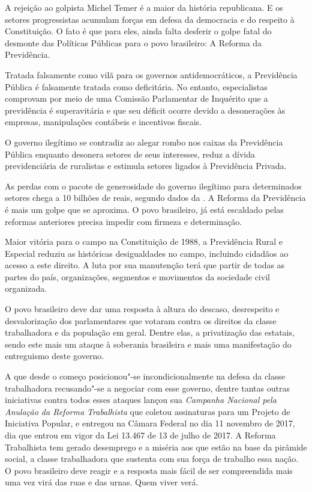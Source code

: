A rejeição ao golpista Michel Temer é a maior da história republicana. E
os setores progressistas acumulam forças em defesa da democracia e do
respeito à Constituição. O fato é que para eles, ainda falta desferir o
golpe fatal do desmonte das Políticas Públicas para o povo brasileiro: A
Reforma da Previdência.

Tratada falsamente como vilã para os governos antidemocráticos, a
Previdência Pública é falsamente tratada como deficitária. No entanto,
especialistas comprovam por meio de uma Comissão Parlamentar de
Inquérito que a previdência é superavitária e que seu déficit ocorre
devido a desonerações às empresas, manipulações contábeis e incentivos
fiscais.

O governo ilegítimo se contradiz ao alegar rombo nos caixas da
Previdência Pública enquanto desonera setores de seus interesses, reduz
a dívida previdenciária de ruralistas e estimula setores ligados à
Previdência Privada.

As perdas com o pacote de generosidade do governo ilegítimo para
determinados setores chega a 10 bilhões de reais, segundo dados da .
A Reforma da Previdência é mais um golpe que se aproxima. O povo
brasileiro, já está escaldado pelas reformas anteriores precisa impedir
com firmeza e determinação.

Maior vitória para o campo na Constituição de 1988, a Previdência Rural
e Especial reduziu as históricas desigualdades no campo, incluindo
cidadãos ao acesso a este direito. A luta por sua manutenção terá que
partir de todas as partes do país, organizações, segmentos e movimentos
da sociedade civil organizada.

O povo brasileiro deve dar uma resposta à altura do descaso, desrespeito
e desvalorização dos parlamentares que votaram contra os direitos da
classe trabalhadora e da população em geral. Dentre elas, a privatização
das estatais, sendo este mais um ataque à soberania brasileira e mais
uma manifestação do entreguismo deste governo.

A  que desde o começo posicionou"-se incondicionalmente na defesa da classe trabalhadora recusando"-se a negociar com esse governo, dentre tantas outras iniciativas contra todos esses ataques lançou sua \emph{Campanha Nacional pela Anulação da Reforma Trabalhista} que coletou assinaturas para um Projeto de Iniciativa Popular,  e entregou na Câmara Federal no dia 11 novembro de 2017, dia que entrou em vigor da Lei 13.467 de 13 de julho de 2017. A Reforma Trabalhista tem gerado desemprego e a miséria aos que estão na base da pirâmide social, a classe trabalhadora que sustenta com sua força de trabalho essa nação. O povo brasileiro deve reagir e a resposta mais fácil de ser compreendida mais uma vez virá das ruas e das urnas. Quem viver verá. 

